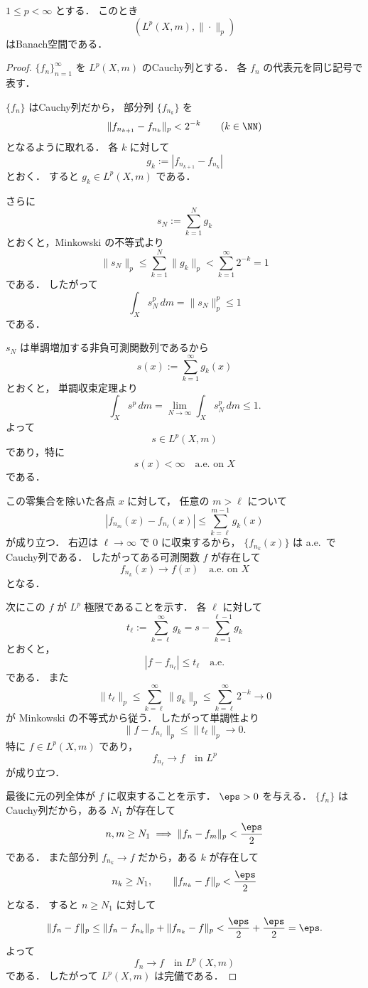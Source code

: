 \begin{theorem}
$1\le p<\infty$ とする．
このとき
\[
(L^p(X,m),\|\cdot\|_p)
\]
はBanach空間である．
\end{theorem}
\begin{proof}
$\{f_n\}_{n=1}^{\infty}$ を $L^p(X,m)$ のCauchy列とする．
各 $f_n$ の代表元を同じ記号で表す．

$\{f_n\}$ はCauchy列だから，
部分列 $\{f_{n_k}\}$ を
\[
\|f_{n_{k+1}}-f_{n_k}\|_p<2^{-k}
\qquad (k\in\NN)
\]
となるように取れる．
各 $k$ に対して
\[
g_k:=|f_{n_{k+1}}-f_{n_k}|
\]
とおく．
すると $g_k\in L^p(X,m)$ である．

さらに
\[
s_N:=\sum_{k=1}^N g_k
\]
とおくと，Minkowski の不等式より
\[
\|s_N\|_p
\le
\sum_{k=1}^N \|g_k\|_p
<
\sum_{k=1}^{\infty}2^{-k}
=1
\]
である．
したがって
\[
\int_X s_N^p\,dm=\|s_N\|_p^p\le 1
\]
である．

$s_N$ は単調増加する非負可測関数列であるから
\[
s(x):=\sum_{k=1}^{\infty}g_k(x)
\]
とおくと，
単調収束定理より
\[
\int_X s^p\,dm
=
\lim_{N\to\infty}\int_X s_N^p\,dm
\le 1.
\]
よって
\[
s\in L^p(X,m)
\]
であり，特に
\[
s(x)<\infty
\quad \text{a.e. on } X
\]
である．

この零集合を除いた各点 $x$ に対して，
任意の $m>\ell$ について
\[
|f_{n_m}(x)-f_{n_\ell}(x)|
\le
\sum_{k=\ell}^{m-1}g_k(x)
\]
が成り立つ．
右辺は $\ell\to\infty$ で $0$ に収束するから，
$\{f_{n_k}(x)\}$ は a.e.\ でCauchy列である．
したがってある可測関数 $f$ が存在して
\[
f_{n_k}(x)\to f(x)
\quad \text{a.e. on } X
\]
となる．

次にこの $f$ が $L^p$ 極限であることを示す．
各 $\ell$ に対して
\[
t_\ell:=\sum_{k=\ell}^{\infty}g_k
=
s-\sum_{k=1}^{\ell-1}g_k
\]
とおくと，
\[
|f-f_{n_\ell}|\le t_\ell
\quad \text{a.e.}
\]
である．
また
\[
\|t_\ell\|_p
\le
\sum_{k=\ell}^{\infty}\|g_k\|_p
\le
\sum_{k=\ell}^{\infty}2^{-k}
\to 0
\]
が Minkowski の不等式から従う．
したがって単調性より
\[
\|f-f_{n_\ell}\|_p\le \|t_\ell\|_p\to 0.
\]
特に $f\in L^p(X,m)$ であり，
\[
f_{n_\ell}\to f \quad \text{in } L^p
\]
が成り立つ．

最後に元の列全体が $f$ に収束することを示す．
$\eps>0$ を与える．
$\{f_n\}$ はCauchy列だから，ある $N_1$ が存在して
\[
n,m\ge N_1
\implies
\|f_n-f_m\|_p<\frac{\eps}{2}
\]
である．
また部分列 $f_{n_k}\to f$ だから，ある $k$ が存在して
\[
n_k\ge N_1,
\qquad
\|f_{n_k}-f\|_p<\frac{\eps}{2}
\]
となる．
すると $n\ge N_1$ に対して
\[
\|f_n-f\|_p
\le
\|f_n-f_{n_k}\|_p+\|f_{n_k}-f\|_p
<
\frac{\eps}{2}+\frac{\eps}{2}
=\eps.
\]
よって
\[
f_n\to f \quad \text{in } L^p(X,m)
\]
である．
したがって $L^p(X,m)$ は完備である．
\end{proof}

